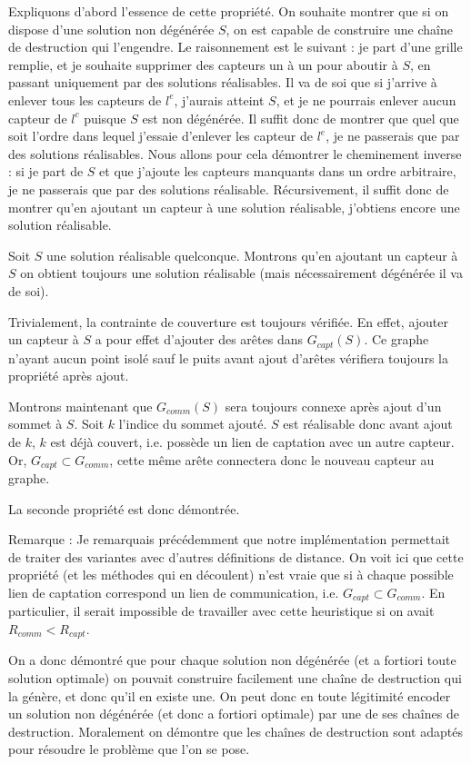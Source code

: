 \documentclass[12pt,a4paper]{article}
\begin{document}
Expliquons d'abord l'essence de cette propriété. On souhaite montrer que si on dispose d'une solution non dégénérée $S$, on est capable de construire une chaîne de destruction qui l'engendre. Le raisonnement est le suivant : je part d'une grille remplie, et je souhaite supprimer des capteurs un à un pour aboutir à $S$, en passant uniquement par des solutions réalisables. Il va de soi que si j'arrive à enlever tous les capteurs de $l^e$, j'aurais atteint $S$, et je ne pourrais enlever aucun capteur de $l^c$ puisque $S$ est non dégénérée. Il suffit donc de montrer que quel que soit l'ordre dans lequel j'essaie d'enlever les capteur de $l^e$, je ne passerais que par des solutions réalisables. Nous allons pour cela démontrer le cheminement inverse :  si je part de $S$ et que j'ajoute les capteurs manquants dans un ordre arbitraire, je ne passerais que par des solutions réalisable. Récursivement, il suffit donc de montrer qu'en ajoutant un capteur à une solution réalisable, j'obtiens encore une solution réalisable.
 
Soit $S$ une solution réalisable quelconque. Montrons qu'en ajoutant un capteur à $S$ on obtient toujours une solution réalisable (mais nécessairement dégénérée il va de soi). 

Trivialement, la contrainte de couverture est toujours vérifiée. En effet, ajouter un capteur à $S$ a pour effet d'ajouter des arêtes dans $G_{capt}(S)$. Ce graphe n'ayant aucun point isolé sauf le puits avant ajout d'arêtes vérifiera toujours la propriété après ajout. 

Montrons maintenant que $G_{comm}(S)$ sera toujours connexe après ajout d'un sommet à $S$. Soit $k$ l'indice du sommet ajouté. $S$ est réalisable donc avant ajout de $k$, $k$ est déjà couvert, i.e. possède un lien de captation avec un autre capteur. Or, $G_{capt}\subset G_{comm}$, cette même arête connectera donc le nouveau capteur au graphe.

La seconde propriété est donc démontrée.

Remarque : Je remarquais précédemment que notre implémentation permettait de traiter des variantes avec d'autres définitions de distance. On voit ici que cette propriété (et les méthodes qui en découlent) n'est vraie que si à chaque possible lien de captation correspond un lien de communication, i.e.  $G_{capt}\subset G_{comm}$. En particulier, il serait impossible de travailler avec cette heuristique si on avait $R_{comm}<R_{capt}$.

On a donc démontré que pour chaque solution non dégénérée (et a fortiori toute solution optimale) on pouvait construire facilement une chaîne de destruction qui la génère, et donc qu'il en existe une. On peut donc en toute légitimité encoder un solution non dégénérée (et donc a fortiori optimale) par une de ses chaînes de destruction. Moralement on démontre que les chaînes de destruction sont adaptés pour résoudre le problème que l'on se pose.  
\end{document}
